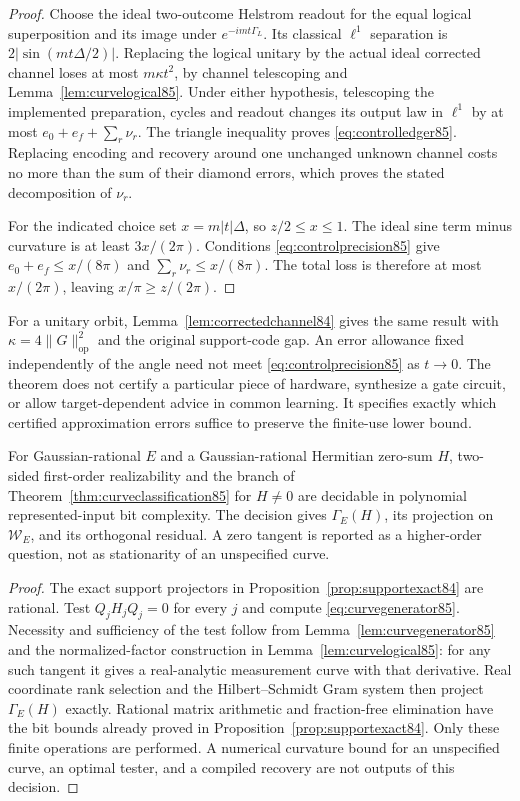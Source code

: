 \begin{proof}
Choose the ideal two-outcome Helstrom readout for the equal logical
superposition and its image under $e^{-imt\Gamma_L}$.
Its classical $\ell^1$ separation is $2|\sin(mt\Delta/2)|$.
Replacing the logical unitary by the actual ideal corrected channel
loses at most $m\kappa t^2$, by channel telescoping and
Lemma~\ref{lem:curvelogical85}.  Under either hypothesis,
telescoping the implemented preparation, cycles and readout changes
its output law in $\ell^1$ by at most
$e_0+e_f+\sum_r\nu_r$.  The triangle inequality proves
\eqref{eq:controlledger85}.  Replacing encoding and recovery around
one unchanged unknown channel costs no more than the sum of their
diamond errors, which proves the stated decomposition of $\nu_r$.

For the indicated choice set $x=m|t|\Delta$, so $z/2\le x\le1$.
The ideal sine term minus curvature is at least $3x/(2\pi)$.
Conditions \eqref{eq:controlprecision85} give
$e_0+e_f\le x/(8\pi)$ and $\sum_r\nu_r\le x/(8\pi)$.
The total loss is therefore at most $x/(2\pi)$, leaving
$x/\pi\ge z/(2\pi)$.
\end{proof}

For a unitary orbit, Lemma~\ref{lem:correctedchannel84} gives the
same result with $\kappa=4\|G\|_{\mathrm{op}}^2$ and the original
support-code gap.  An error allowance fixed independently of the
angle need not meet \eqref{eq:controlprecision85} as $t\to0$.
The theorem does not certify a particular piece of hardware, synthesize
a gate circuit, or allow target-dependent advice in common learning.
It specifies exactly which certified approximation errors suffice
to preserve the finite-use lower bound.

\begin{proposition}\label{prop:curveexact85}
For Gaussian-rational $E$ and a Gaussian-rational Hermitian zero-sum
$H$, two-sided first-order realizability and the branch of
Theorem~\ref{thm:curveclassification85} for $H\ne0$ are decidable
in polynomial represented-input bit complexity.  The decision gives
$\Gamma_E(H)$, its projection on $\mathcal W_E$, and its orthogonal
residual.  A zero tangent is reported as a higher-order question,
not as stationarity of an unspecified curve.
\end{proposition}
\begin{proof}
The exact support projectors in Proposition~\ref{prop:supportexact84}
are rational.  Test $Q_jH_jQ_j=0$ for every $j$ and compute
\eqref{eq:curvegenerator85}.  Necessity and sufficiency of the test
follow from Lemma~\ref{lem:curvegenerator85} and the normalized-factor
construction in Lemma~\ref{lem:curvelogical85}: for any such tangent
it gives a real-analytic measurement curve with that derivative.
Real coordinate rank selection and the Hilbert--Schmidt Gram system
then project $\Gamma_E(H)$ exactly.  Rational matrix arithmetic and
fraction-free elimination have the bit bounds already proved in
Proposition~\ref{prop:supportexact84}.  Only these finite operations
are performed.  A numerical curvature bound for an unspecified
curve, an optimal tester, and a compiled recovery are not outputs
of this decision.
\end{proof}
